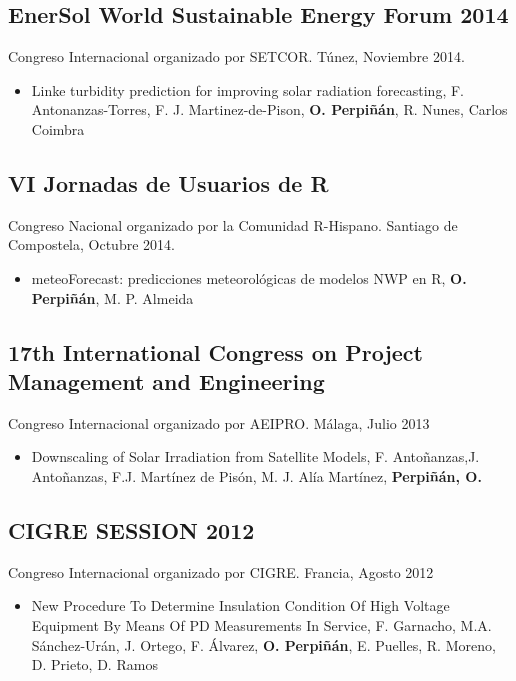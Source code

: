 \documentclass[article, a4paper]{memoir}
\begin{document}
\subsection{EnerSol World Sustainable Energy Forum 2014}
\label{sec:orgheadline52}
Congreso Internacional organizado por SETCOR. Túnez, Noviembre 2014.

\begin{itemize}
\item Linke turbidity prediction for improving solar radiation forecasting, F. Antonanzas-Torres, F. J. Martinez-de-Pison, \textbf{O. Perpiñán}, R. Nunes, Carlos Coimbra
\end{itemize}

\subsection{VI Jornadas de Usuarios de R}
\label{sec:orgheadline53}
Congreso Nacional organizado por la Comunidad R-Hispano. Santiago de Compostela, Octubre 2014. 

\begin{itemize}
\item meteoForecast: predicciones meteorológicas de modelos NWP en R, \textbf{O. Perpiñán}, M. P. Almeida
\end{itemize}

\subsection{17th International Congress on  Project Management and Engineering}
\label{sec:orgheadline54}
Congreso Internacional organizado por AEIPRO. Málaga, Julio 2013

\begin{itemize}
\item Downscaling of Solar Irradiation from Satellite Models, F. Antoñanzas,J. Antoñanzas, F.J. Martínez de Pisón, M. J. Alía Martínez, \textbf{Perpiñán, O.}
\end{itemize}
\subsection{CIGRE SESSION 2012}
\label{sec:orgheadline55}
Congreso Internacional organizado por CIGRE. Francia, Agosto 2012

\begin{itemize}
\item New Procedure To Determine Insulation Condition Of High Voltage Equipment By Means Of PD Measurements In Service, F. Garnacho, M.A. Sánchez-Urán, J. Ortego, F. Álvarez, \textbf{O. Perpiñán}, E. Puelles, R. Moreno, D. Prieto, D. Ramos
\end{itemize}
\end{document}
